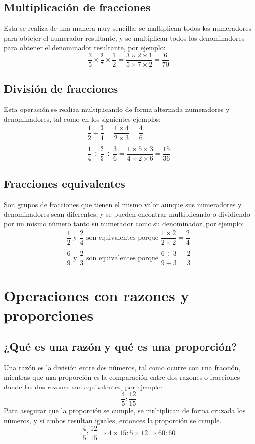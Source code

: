\subsection{Multiplicación de fracciones}
Esta se realiza de una manera muy sencilla: se multiplican todos los numeradores para obtejer el numerador resultante, y se multiplican todos los denominadores para obtener el denominador resultante, por ejemplo:
\begin{equation*}
\dfrac{3}{5}\times\dfrac{2}{7}\times\dfrac{1}{2}=\dfrac{3\times 2\times 1}{5\times 7\times 2}=\dfrac{6}{70}
\end{equation*}

\subsection{División de fracciones}
Esta operación se realiza multiplicando de forma alternada numeradores y denominadores, tal como en los siguientes ejemplos:
\begin{eqnarray*}
\dfrac{1}{2}\div\dfrac{3}{4}=\dfrac{1\times 4}{2\times 3}=\dfrac{4}{6}\\
\\
\dfrac{1}{4}\div\dfrac{2}{5}\div\dfrac{3}{6}=\dfrac{1\times 5\times 3}{4\times 2\times 6}=\dfrac{15}{36}
\end{eqnarray*}
\subsection{Fracciones equivalentes}
Son grupos de fracciones que tienen el mismo valor aunque sus numeradores y denominadores sean diferentes, y se pueden encontrar multiplicando o dividiendo por un mismo número tanto su numerador como su denominador, por ejemplo:
\begin{eqnarray*}
\dfrac{1}{2}\text{ y }\dfrac{2}{4}\text{ son equivalentes porque }\dfrac{1 \times 2}{2 \times 2} = \dfrac{2}{4}\\
\\
\dfrac{6}{9}\text{ y }\dfrac{2}{3}\text{ son equivalentes porque }\dfrac{6 \div 3}{9 \div 3} = \dfrac{2}{3}
\end{eqnarray*}
\section{Operaciones con razones y proporciones}

\subsection{¿Qué es una razón y qué es una proporción?}
Una razón es la división entre dos números, tal como ocurre con una fracción, mientras que una proporción es la comparación entre dos razones o fracciones donde las dos razones son equivalentes, por ejemplo:
\begin{equation*}
\dfrac{4}{5}:\dfrac{12}{15}
\end{equation*}
Para asegurar que la proporción se cumple, se multiplican de forma cruzada los números, y si ambos resultan iguales, entonces la proporción se cumple.
\begin{equation*}
\dfrac{4}{5}:\dfrac{12}{15}\Rightarrow 4\times 15 : 5\times{12}\Rightarrow 60:60
\end{equation*}
